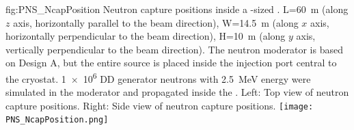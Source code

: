 \begin{dunefigure}{fig:PNS_NcapPosition}
{Neutron capture positions inside a -sized . L=\SI{60}{\m} (along $z$ axis, horizontally parallel to the beam direction), W=\SI{14.5}{\m} (along $x$ axis, horizontally perpendicular to the beam direction), H=\SI{10}{\m} (along $y$ axis, vertically perpendicular to the beam direction). The neutron moderator is based on Design A, but the entire source is placed inside the injection port central to the cryostat. \num{1e6} DD generator neutrons with \SI{2.5}{\MeV} energy were simulated in the moderator and propagated inside the  . Left: Top view of neutron capture positions. Right: Side view of neutron capture positions.}
\texttt{[image: PNS\_NcapPosition.png]}
\end{dunefigure}


